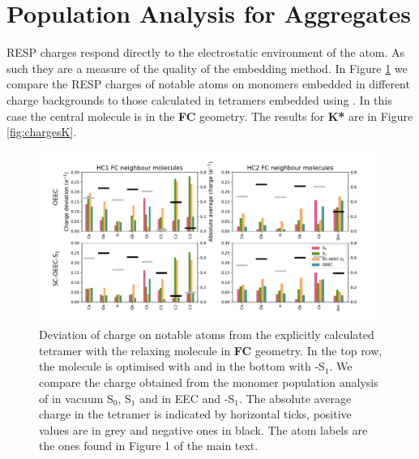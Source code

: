 \section{Population Analysis for Aggregates}
\label{app:sec:pop_analysis_aggregates}

RESP charges respond directly to the electrostatic environment of the atom. As such they are a measure of the quality of the embedding method. In Figure \ref{fig:chargesFC} we compare the RESP charges of notable atoms on monomers embedded in different charge backgrounds to those calculated in tetramers embedded using \EEC{}. In this case the central molecule is in the \textbf{FC} geometry. The results for \textbf{K*} are in Figure \ref{fig:chargesK}.


\begin{figure}[H]
\includegraphics[width=\textwidth]{Appendices/A/just_FC.pdf}
\caption{Deviation of charge on notable atoms from the explicitly calculated tetramer with the relaxing molecule in \textbf{FC} geometry. In the top row, the molecule is optimised with \EEC{} and in the bottom with \SCEEC{}-S$_1$. We compare the charge obtained from the monomer population analysis of in vacuum S$_0$, S$_1$ and in EEC and \SCEEC{}-S$_1$. The absolute average charge in the tetramer is indicated by horizontal ticks, positive values are in grey and negative ones in black. The atom labels are the ones found in Figure 1 of the main text.}
\label{fig:chargesFC}
\end{figure}


